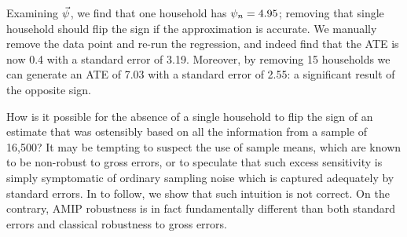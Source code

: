 Examining $\vec{\psi}$, we find that one household has $\psi_n = 4.95$; removing
that single household should flip the sign if the approximation is accurate. We
manually remove the data point and re-run the regression, and indeed find that
the ATE is now 0.4 with a standard error of 3.19. Moreover, by removing 15
households we can generate an ATE of 7.03 with a standard error of 2.55: a
significant result of the opposite sign.

How is it possible for the absence of a single household to flip the sign of an
estimate that was ostensibly based on all the information from a sample of
16,500?  It may be tempting to suspect the use of sample means, which are known
to be non-robust to gross errors, or to speculate that such excess sensitivity
is simply symptomatic of ordinary sampling noise which is captured adequately by
standard errors.  In  to follow, we show that such intuition is not
correct.  On the contrary, AMIP robustness is in fact fundamentally different
than both standard errors and classical robustness to gross errors.

%
